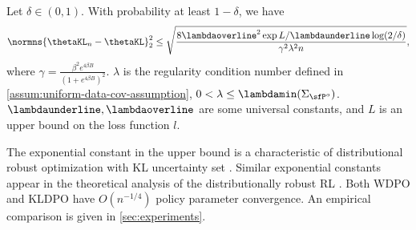 \begin{theorem}
    Let $\delta\in(0,1)$. With probability at least $1-\delta$, we have
    \begin{equation*}
        \normns{\thetaKL_n-\thetaKL}^2_2 \leq \sqrt{\frac{8\lambdaoverline^2\exp{L/\lambdaunderline}\log(2/\delta)}{\gamma^2\lambda^2n}},
    \end{equation*}
    where  $\gamma=\frac{\beta^2e^{4\beta B}}{(1+e^{4\beta B})^2}$. $\lambda$ is the regularity condition number defined in \cref{assum:uniform-data-cov-assumption}, $0<\lambda\leq \lambdamin(\Sigma_{\sfP^o})$. $\lambdaunderline,\lambdaoverline$ are some universal constants, and $L$ is an upper bound on the loss function $l$.
\end{theorem}

\begin{remark}
    The exponential constant in the upper bound is a characteristic of distributional robust optimization with KL  uncertainty set \citet[Proposition 2]{hu2013kullback}. Similar exponential constants appear in the theoretical analysis of the distributionally robust RL \citep{zhou2021finite,yang2022toward,panaganti22a,xu-panaganti-2023samplecomplexity}. Both WDPO and KLDPO have $O(n^{-1/4})$ policy parameter convergence. An empirical comparison is given in \cref{sec:experiments}.
\end{remark}